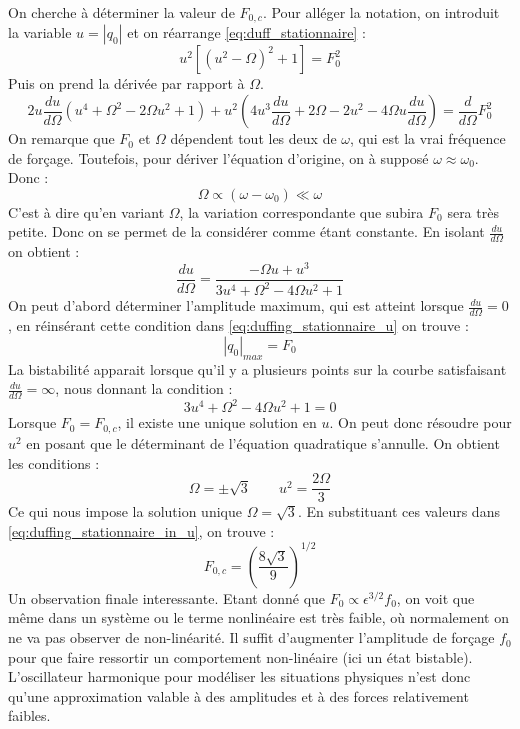 On cherche à déterminer la valeur de $F_{0, c}$. Pour alléger la notation, 
on introduit la variable $u = |q_0|$ et on réarrange \eqref{eq:duff_stationnaire} :
%
\begin{equation}
    u^2[(u^2 - \Omega)^2 + 1] = F_0^2
    \label{eq:duffing_stationnaire_in_u}
\end{equation}
%
Puis on prend la dérivée par rapport à $\Omega$.
%
\begin{equation}
    2u\frac{du}{d\Omega}(u^4 + \Omega^2 - 2\Omega u^2 + 1) + u^2(4u^3\frac{du}{d\Omega} + 2\Omega - 2u^2 - 4\Omega u\frac{du}{d\Omega}) = \frac{d}{d\Omega}F_0^2
\end{equation}
%
On remarque que $F_0$ et $\Omega$ dépendent tout les deux de $\omega$, qui est la vrai fréquence de forçage. Toutefois, pour dériver l'équation d'origine, on à supposé $\omega \approx \omega_0$. Donc : 
%
\begin{equation*}
    \Omega \propto (\omega - \omega_0) \ll \omega
\end{equation*}
%
C'est à dire qu'en variant $\Omega$, la variation correspondante que subira $F_0$ sera très petite. Donc on se permet de la considérer comme étant constante. En isolant $\frac{du}{d\Omega}$ on obtient :
%
\begin{equation}
    \frac{du}{d\Omega} = \frac{-\Omega u + u^3}{3u^4 + \Omega^2 - 4\Omega u^2 + 1}
\end{equation}
%
On peut d'abord déterminer l'amplitude maximum, qui est atteint lorsque $\frac{du}{d\Omega}=0$, en réinsérant cette condition dans \eqref{eq:duffing_stationnaire_u} on trouve :
%
\begin{equation*}
    |q_0|_{max} = F_0
\end{equation*}
%
La bistabilité apparait lorsque qu'il y a plusieurs points sur la courbe satisfaisant $\frac{du}{d\Omega}=\infty$, nous donnant la condition :
%
\begin{equation}
    3u^4 + \Omega^2 - 4\Omega u^2 + 1 = 0
\end{equation}
%
Lorsque $F_0 = F_{0,c}$, il existe une unique solution en $u$. On peut donc résoudre pour $u^2$ en posant que le déterminant de l'équation quadratique s'annulle. On obtient les conditions :
%
\begin{equation}
    \Omega = \pm \sqrt{3}
    \qquad
    u^2 = \frac{2\Omega}{3}
\end{equation}
%
Ce qui nous impose la solution unique $\Omega = \sqrt{3}$. En substituant ces valeurs dans \eqref{eq:duffing_stationnaire_in_u}, on trouve :
%
\begin{equation}
    F_{0,c} = \left(  \frac{8\sqrt{3}}{9}  \right)^{1/2}
\end{equation}
%
Un observation finale interessante. Etant donné que $F_0 \propto \epsilon^{3/2}f_0$, 
on voit que même dans un système ou le terme nonlinéaire est très faible, où normalement 
on ne va pas observer de non-linéarité. Il suffit d'augmenter l'amplitude de forçage $f_0$ 
pour que faire ressortir un comportement non-linéaire (ici un état bistable). L'oscillateur harmonique pour modéliser les situations physiques n'est donc qu'une approximation valable à des amplitudes et à des forces relativement faibles.
